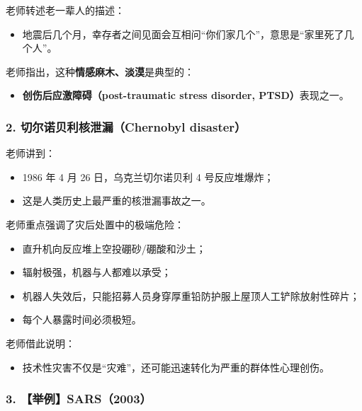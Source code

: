 \documentclass[
  chinese,
  9pt,
  a4paper,
]{ctexart}
\providecommand{\tightlist}{%
  \setlength{\itemsep}{0pt}\setlength{\parskip}{0pt}}
\begin{document}
老师转述老一辈人的描述：

\begin{itemize}
\tightlist
\item
  地震后几个月，幸存者之间见面会互相问``你们家几个''，意思是``家里死了几个人''。
\end{itemize}

老师指出，这种\textbf{情感麻木、淡漠}是典型的：

\begin{itemize}
\tightlist
\item
  \textbf{创伤后应激障碍（post-traumatic stress disorder,
  PTSD）}表现之一。
\end{itemize}

\subsubsection{2. 切尔诺贝利核泄漏（Chernobyl
disaster）}\label{ux5207ux5c14ux8bfaux8d1dux5229ux6838ux6cc4ux6f0fchernobyl-disaster}

老师讲到：

\begin{itemize}
\tightlist
\item
  1986 年 4 月 26 日，乌克兰切尔诺贝利 4 号反应堆爆炸；
\item
  这是人类历史上最严重的核泄漏事故之一。
\end{itemize}

老师重点强调了灾后处置中的极端危险：

\begin{itemize}
\tightlist
\item
  直升机向反应堆上空投硼砂/硼酸和沙土；
\item
  辐射极强，机器与人都难以承受；
\item
  机器人失效后，只能招募人员身穿厚重铅防护服上屋顶人工铲除放射性碎片；
\item
  每个人暴露时间必须极短。
\end{itemize}

老师借此说明：

\begin{itemize}
\tightlist
\item
  技术性灾害不仅是``灾难''，还可能迅速转化为严重的群体性心理创伤。
\end{itemize}

\subsubsection{3. 【举例】SARS（2003）}\label{ux4e3eux4f8bsars2003}
\end{document}
